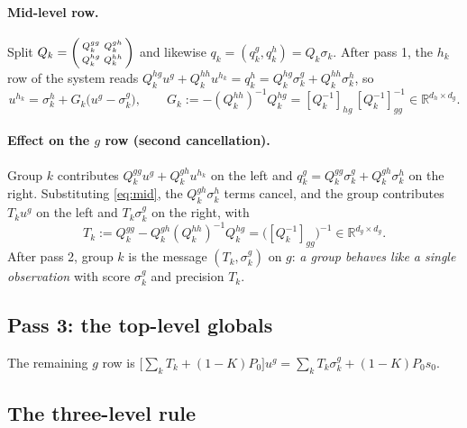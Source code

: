 \documentclass[11pt]{article}
\theoremstyle{definition}
\theoremstyle{remark}
\newcommand{\R}{\mathbb{R}}
\newcommand{\hk}{h_k}
\begin{document}
\paragraph{Mid-level row.} Split $Q_k=\begin{psmallmatrix}Q^{gg}_k&Q^{gh}_k\\Q^{hg}_k&Q^{hh}_k\end{psmallmatrix}$
and likewise $q_k=(q^g_k,q^h_k)=Q_k\sigma_k$. After pass 1, the $\hk$ row of the
system reads $Q^{hg}_ku^g+Q^{hh}_ku^{\hk}=q^h_k=Q^{hg}_k\sigma^g_k+Q^{hh}_k\sigma^h_k$, so
\begin{equation}\label{eq:mid}
u^{\hk}=\sigma^h_k+G_k\big(u^g-\sigma^g_k\big),\qquad
G_k:=-(Q^{hh}_k)^{-1}Q^{hg}_k=[Q_k^{-1}]_{hg}\,[Q_k^{-1}]_{gg}^{-1}\in\R^{d_h\times d_g}.
\end{equation}

\paragraph{Effect on the $g$ row (second cancellation).} Group $k$ contributes
$Q^{gg}_ku^g+Q^{gh}_ku^{\hk}$ on the left and $q^g_k=Q^{gg}_k\sigma^g_k+Q^{gh}_k\sigma^h_k$
on the right. Substituting \eqref{eq:mid}, the $Q^{gh}_k\sigma^h_k$ terms cancel,
and the group contributes $T_ku^g$ on the left and $T_k\sigma^g_k$ on the right, with
\begin{equation}\label{eq:Tk}
T_k:=Q^{gg}_k-Q^{gh}_k(Q^{hh}_k)^{-1}Q^{hg}_k=\big([Q_k^{-1}]_{gg}\big)^{-1}\in\R^{d_g\times d_g}.
\end{equation}
After pass 2, group $k$ is the message $(T_k,\sigma^g_k)$ on $g$: \emph{a group
behaves like a single observation} with score $\sigma^g_k$ and precision $T_k$.

\subsection{Pass 3: the top-level globals}

The remaining $g$ row is
$\big[\sum_kT_k+(1-K)P_0\big]u^g=\sum_kT_k\sigma^g_k+(1-K)P_0s_0$.

\subsection{The three-level rule}
\end{document}
